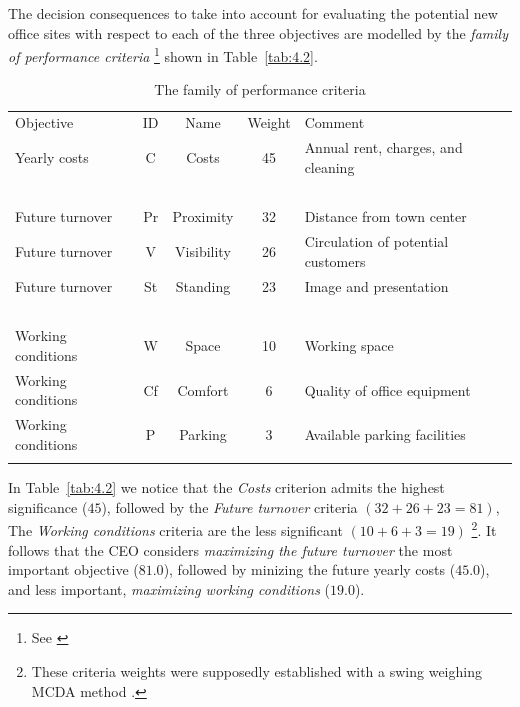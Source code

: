 The decision consequences to take into account for evaluating the potential new office sites with respect to each of the three objectives are modelled by the \emph{family of performance criteria} \footnote{See \citealp{ROY-2000}} shown in Table~\vref{tab:4.2}.
\begin{table}[h]
\caption{The family of performance criteria}
\label{tab:4.2}       %
\begin{center}
    \begin{tabular}{l|c|c|c|l}
      \svhline\noalign{\smallskip}
      Objective & ID & Name & Weight & Comment\\
      \noalign{\smallskip}\hline\noalign{\smallskip}
    Yearly costs  &       C &   Costs &  45 &     Annual rent, charges, and cleaning\\
    \             &  \      & \        &  \ & \ \\
    Future turnover   &   Pr  & Proximity  & 32 & Distance from town center\\
    Future turnover   &   V  &  Visibility & 26 & Circulation of potential customers \\
    Future turnover   &   St &   Standing & 23 &   Image and presentation\\
    \                 &   \   & \          &  \ & \  \\
    Working conditions &  W  &  Space   &   10 &  Working space\\
    Working conditions &  Cf &  Comfort  &  6 &  Quality of office equipment\\
    Working conditions &  P  &  Parking  &  3 &  Available parking facilities\\
      \noalign{\smallskip}\hline
    \end{tabular}   
  \end{center}
\end{table}

In Table~\vref{tab:4.2} we notice that the \emph{Costs} criterion admits the highest significance ($45$), followed by the \emph{Future turnover} criteria $(32 + 26 + 23 = 81)$, The \emph{Working conditions} criteria are the less significant $(10 + 6 + 3 = 19)$ \footnote{These criteria weights were supposedly established with a swing weighing MCDA method \citep{KEE-1976}.}. It follows that the CEO considers \emph{maximizing the future turnover} the most important objective ($81.0$), followed by minizing the future yearly costs ($45.0$), and less important, \emph{maximizing working conditions} ($19.0$). 


